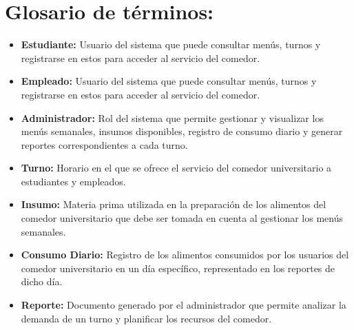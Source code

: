 \documentclass[12pt]{article}
\begin{document}
    \section{Glosario de términos:}
    \medskip
    \begin{itemize}
        \item \textbf{Estudiante:} Usuario del sistema que puede consultar menús, turnos y registrarse en estos para acceder al servicio del comedor.
        \item \textbf{Empleado:} Usuario del sistema que puede consultar menús, turnos y registrarse en estos para acceder al servicio del comedor.
        \item \textbf{Administrador:} Rol del sistema que permite gestionar y visualizar los menús semanales, insumos disponibles, registro de consumo diario y generar reportes correspondientes a cada turno.
        \item \textbf{Turno:} Horario en el que se ofrece el servicio del comedor universitario a estudiantes y empleados.
        \item \textbf{Insumo:} Materia prima utilizada en la preparación de los alimentos del comedor universitario que debe ser tomada en cuenta al gestionar los menús semanales.
        \item \textbf{Consumo Diario:} Registro de los alimentos consumidos por los usuarios del comedor universitario en un día específico, representado en los reportes de dicho día.
        \item \textbf{Reporte:} Documento generado por el administrador que permite analizar la demanda de un turno y planificar los recursos del comedor.
    \end{itemize}
    \newpage
\end{document}
